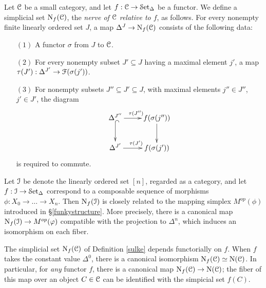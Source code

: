\begin{definition}\label{sulke}
Let $\operatorname{\mathcal{C}}$ be a small category, and let $f: \operatorname{\mathcal{C}} \rightarrow \operatorname{\mathcal{S}et_{\Delta}}$ be a functor. We define a simplicial set $\operatorname{N}_{f}(\operatorname{\mathcal{C}})$, the {\it nerve of $\operatorname{\mathcal{C}}$ relative to $f$}, as follows. For every nonempty finite linearly ordered set $J$, a map $\Delta^J \rightarrow \operatorname{N}_{f}(\operatorname{\mathcal{C}})$ consists of the following data:
\begin{itemize}
\item[$(1)$] A functor $\sigma$ from $J$ to $\operatorname{\mathcal{C}}$. 
\item[$(2)$] For every nonempty subset $J' \subseteq J$ having a maximal element $j'$, a
map $\tau(J'): \Delta^{J'} \rightarrow \operatorname{\mathcal{F}}( \sigma(j'))$. 
\item[$(3)$] For nonempty subsets $J'' \subseteq J' \subseteq J$, with maximal elements $j'' \in J''$, $j' \in J'$, the diagram $$ \xymatrix{ \Delta^{J''} \ar[r]^{\tau(J'')} \ar@{^{(}->}[d] & f( \sigma(j'') ) \ar[d] \\
\Delta^{J'} \ar[r]^{\tau(J')} & f( \sigma(j') ) }$$
is required to commute.
\end{itemize}
\end{definition}

\begin{remark}
Let $\operatorname{\mathcal{I}}$ be denote the linearly ordered set $[n]$, regarded as a category, and let
$f: \operatorname{\mathcal{I}} \rightarrow \operatorname{\mathcal{S}et_{\Delta}}$ correspond to a composable sequence of morphisms
$\phi: X_0 \rightarrow \ldots \rightarrow X_n$.
Then $\operatorname{N}_{f}(\operatorname{\mathcal{I}})$ is closely related to the mapping simplex $M^{op}(\phi)$ introduced in \S \ref{funkystructure}. More precisely, there is a canonical map $\operatorname{N}_{f}(\operatorname{\mathcal{I}}) \rightarrow M^{op}(\varphi)$ compatible with the projection to $\Delta^{n}$, which induces an isomorphism on each fiber.
\end{remark}

\begin{remark}\label{staplur}
The simplicial set $\operatorname{N}_{f}(\operatorname{\mathcal{C}})$ of Definition \ref{sulke} depends functorially on $f$. When
$f$ takes the constant value $\Delta^0$, there is a canonical isomorphism
$\operatorname{N}_{f}(\operatorname{\mathcal{C}}) \simeq \operatorname{N}(\operatorname{\mathcal{C}})$. In particular, for {\em any} functor $f$, there is a canonical map $\operatorname{N}_{f}(\operatorname{\mathcal{C}}) \rightarrow \operatorname{N}(\operatorname{\mathcal{C}})$; the fiber of this map over an object $C \in \operatorname{\mathcal{C}}$ can be identified with the simpicial set $f(C)$. 
\end{remark}

